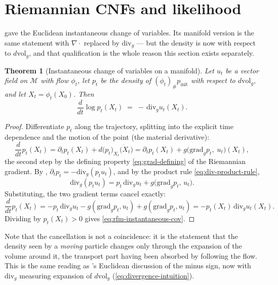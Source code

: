 \documentclass[11pt,a4paper]{report}
\newtheorem{theorem}{Theorem}[chapter]
\theoremstyle{definition}
\theoremstyle{remark}
\begin{document}
\section{Riemannian CNFs and likelihood}
\label{sec:rfm-cnf}

 gave the Euclidean instantaneous change of
variables. Its manifold version is the same statement with $\nabla\cdot$
replaced by $\mathrm{div}_g$ --- but the density is now with respect to
$d\mathrm{vol}_g$, and that qualification is the whole reason this section
exists separately.

\begin{theorem}[Instantaneous change of variables on a manifold]
\label{thm:rfm-instantaneous-cov}
Let $u_t$ be a vector field on $\mathcal M$ with flow $\phi_t$, let
$p_t$ be the density of $(\phi_t)_\#p_{\mathrm{init}}$ \emph{with respect to
$d\mathrm{vol}_g$}, and let $X_t=\phi_t(X_0)$. Then
\begin{equation}
\label{eq:rfm-instantaneous-cov}
\frac{d}{dt}\log p_t(X_t) \;=\; -\,\mathrm{div}_g u_t(X_t) .
\end{equation}
\end{theorem}

\begin{proof}
Differentiate $p_t$ along the trajectory, splitting into the explicit time
dependence and the motion of the point (the material derivative):
\[
\frac{d}{dt}p_t(X_t)
= \partial_tp_t(X_t) + d\bigl(p_t\bigr)_{X_t}\!\bigl(\dot X_t\bigr)
= \partial_tp_t(X_t) + g\bigl(\mathrm{grad}_gp_t,\;u_t\bigr)(X_t) ,
\]
the second step by the defining property \eqref{eq:grad-defining} of the
Riemannian gradient. By ,
$\partial_tp_t=-\mathrm{div}_g(p_tu_t)$, and by the product rule
\eqref{eq:div-product-rule},
\[
\mathrm{div}_g(p_tu_t) = p_t\,\mathrm{div}_gu_t + g\bigl(\mathrm{grad}_gp_t,\,u_t\bigr) .
\]
Substituting, the two gradient terms cancel exactly:
\[
\frac{d}{dt}p_t(X_t)
= -p_t\,\mathrm{div}_gu_t - g(\mathrm{grad}_gp_t,u_t) + g(\mathrm{grad}_gp_t,u_t)
= -p_t(X_t)\,\mathrm{div}_gu_t(X_t) .
\]
Dividing by $p_t(X_t)>0$ gives \eqref{eq:rfm-instantaneous-cov}.
\end{proof}

Note that the cancellation is not a coincidence: it is the statement that
the density seen by a \emph{moving} particle changes only through the
expansion of the volume around it, the transport part having been absorbed
by following the flow. This is the same reading as
's Euclidean discussion of the minus sign, now with
$\mathrm{div}_g$ measuring expansion of $d\mathrm{vol}_g$
(\eqref{eq:divergence-intuition}).
\end{document}
